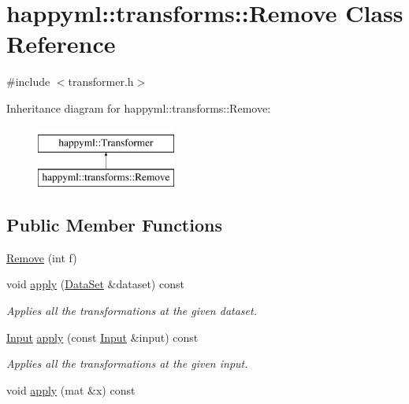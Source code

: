 \hypertarget{classhappyml_1_1transforms_1_1Remove}{}\section{happyml\+:\+:transforms\+:\+:Remove Class Reference}
\label{classhappyml_1_1transforms_1_1Remove}


{\ttfamily \#include $<$transformer.\+h$>$}

Inheritance diagram for happyml\+:\+:transforms\+:\+:Remove\+:\begin{figure}[H]
\begin{center}
\leavevmode
\includegraphics[height=2.000000cm]{classhappyml_1_1transforms_1_1Remove}
\end{center}
\end{figure}
\subsection*{Public Member Functions}
\begin{DoxyCompactItemize}
\item 
\hyperlink{classhappyml_1_1transforms_1_1Remove_a4b57c4b43e1d41229faec756ec3d66d5}{Remove} (int f)
\item 
void \hyperlink{classhappyml_1_1transforms_1_1Remove_a901c9a5c55f4b360233b8ba7e46fc198}{apply} (\hyperlink{classhappyml_1_1DataSet}{Data\+Set} \&dataset) const 
\begin{DoxyCompactList}\small\item\em Applies all the transformations at the given dataset. \end{DoxyCompactList}\item 
\hyperlink{namespacehappyml_a03602d1ec49393790b8a0449f40cd01f}{Input} \hyperlink{classhappyml_1_1transforms_1_1Remove_a249eec291d4c15b4e8e044c38a994770}{apply} (const \hyperlink{namespacehappyml_a03602d1ec49393790b8a0449f40cd01f}{Input} \&input) const 
\begin{DoxyCompactList}\small\item\em Applies all the transformations at the given input. \end{DoxyCompactList}\item 
void \hyperlink{classhappyml_1_1transforms_1_1Remove_a4f939046d630fa525dcc6d406b66e5b6}{apply} (mat \&x) const 
\end{DoxyCompactItemize}
